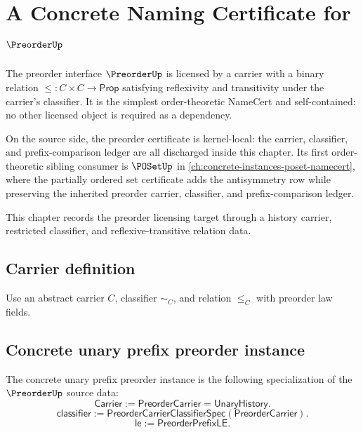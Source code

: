 \chapter{A Concrete Naming Certificate for \(\PreorderUp\)}
\label{ch:concrete-instances-preorder-namecert}

The preorder interface \(\PreorderUp\) is licensed by a carrier with a binary relation \(\le : C \times C \to \mathsf{Prop}\) satisfying reflexivity and transitivity under the carrier's classifier. It is the simplest order-theoretic NameCert and self-contained: no other licensed object is required as a dependency.

On the source side, the preorder certificate is kernel-local: the carrier, classifier, and prefix-comparison ledger are all discharged inside this chapter. Its first order-theoretic sibling consumer is \(\POSetUp\) in \autoref{ch:concrete-instances-poset-namecert}, where the partially ordered set certificate adds the antisymmetry row while preserving the inherited preorder carrier, classifier, and prefix-comparison ledger.

\begin{remark}
\label{rem:concrete-instances-preorder-namecert-roadmap}
This chapter records the preorder licensing target through a history
carrier, restricted classifier, and reflexive-transitive relation data.
\end{remark}

\section{Carrier definition}

\begin{definition}
\label{def:preorder-carrier}
Use an abstract carrier \(C\), classifier \(\sim_C\), and relation \(\le_C\) with preorder law fields.
\end{definition}

\section{Concrete unary prefix preorder instance}
\label{sec:preorder-concrete-unary-prefix-instance}

\begin{definition}
\label{def:concrete-unary-prefix-preorder-instance}
The concrete unary prefix preorder instance is the following specialization of
the $\PreorderUp$ source data:
$$
\mathsf{Carrier}:=\mathsf{PreorderCarrier}=\mathsf{UnaryHistory}.
$$
$$
\mathsf{classifier}:=\mathsf{PreorderCarrierClassifierSpec}(\mathsf{PreorderCarrier}).
$$
$$
\mathsf{le}:=\mathsf{PreorderPrefixLE}.
$$
\end{definition}

